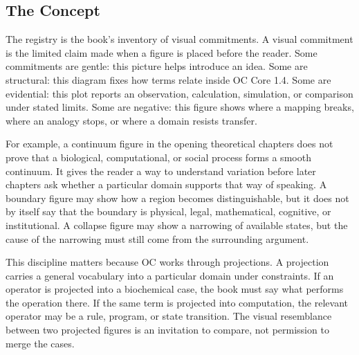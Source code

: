 \documentclass[11pt,a4paper,openany]{book}
\begin{document}
\subsection{The Concept}
The registry is the book's inventory of visual commitments. A visual commitment is the limited claim made when a figure is placed before the reader. Some commitments are gentle: this picture helps introduce an idea. Some are structural: this diagram fixes how terms relate inside OC Core 1.4. Some are evidential: this plot reports an observation, calculation, simulation, or comparison under stated limits. Some are negative: this figure shows where a mapping breaks, where an analogy stops, or where a domain resists transfer. \cite{kauffman_autocatalytic,raf_networks}\par
For example, a continuum figure in the opening theoretical chapters does not prove that a biological, computational, or social process forms a smooth continuum. It gives the reader a way to understand variation before later chapters ask whether a particular domain supports that way of speaking. A boundary figure may show how a region becomes distinguishable, but it does not by itself say that the boundary is physical, legal, mathematical, cognitive, or institutional. A collapse figure may show a narrowing of available states, but the cause of the narrowing must still come from the surrounding argument.\par
This discipline matters because OC works through projections. A projection carries a general vocabulary into a particular domain under constraints. If an operator is projected into a biochemical case, the book must say what performs the operation there. If the same term is projected into computation, the relevant operator may be a rule, program, or state transition. The visual resemblance between two projected figures is an invitation to compare, not permission to merge the cases.\par
\end{document}
